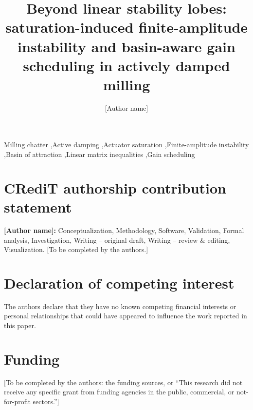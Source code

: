 \documentclass[preprint,12pt]{elsarticle}
\begin{document}
\begin{frontmatter}

\title{Beyond linear stability lobes: saturation-induced finite-amplitude instability and basin-aware gain scheduling in actively damped milling}

\author[a]{[Author name]}

\begin{abstract}

\end{abstract}

\begin{keyword}
Milling chatter \sep Active damping \sep Actuator saturation \sep Finite-amplitude instability \sep Basin of attraction \sep Linear matrix inequalities \sep Gain scheduling
\end{keyword}

\end{frontmatter}

\linenumbers










\section*{CRediT authorship contribution statement}
\textbf{[Author name]:} Conceptualization, Methodology, Software, Validation, Formal analysis, Investigation, Writing -- original draft, Writing -- review \& editing, Visualization. [To be completed by the authors.]

\section*{Declaration of competing interest}
The authors declare that they have no known competing financial interests or personal relationships that could have appeared to influence the work reported in this paper.

\section*{Funding}
[To be completed by the authors: the funding sources, or ``This research did not receive any specific grant from funding agencies in the public, commercial, or not-for-profit sectors.'']
\end{document}
